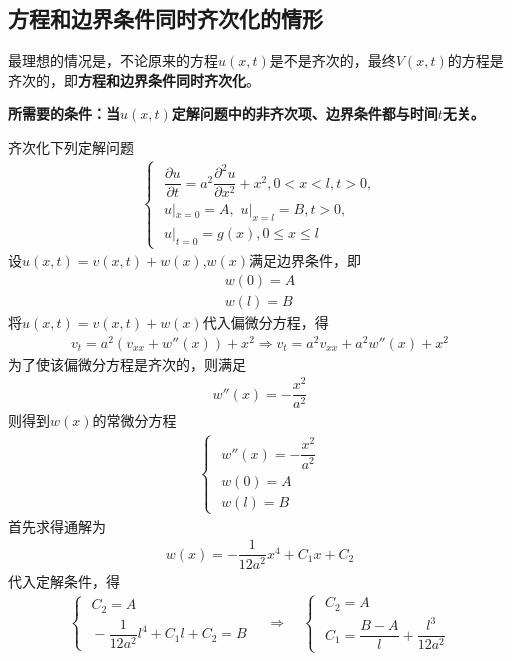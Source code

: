 \subsection{方程和边界条件同时齐次化的情形}
最理想的情况是，不论原来的方程$u(x,t)$是不是齐次的，最终$V(x,t)$的方程是齐次的，即\textbf{方程和边界条件同时齐次化}。

\textbf{所需要的条件：当$u(x,t)$定解问题中的非齐次项、边界条件都与时间$t$无关。}

\examples 齐次化下列定解问题
\begin{align*}
	\begin{cases}
		\,\, \dfrac{\partial u}{\partial t} = a^2 \dfrac{\partial^2 u}{\partial x^2} + x^2, 0<x<l, t>0,\\
		\,\, u|_{x = 0} = A, \,\, u|_{x=l} = B, t>0, \\
		\,\, u|_{t = 0} = g(x), 0 \le x \le l
	\end{cases}
\end{align*}
\solve
设$u(x,t) = v(x,t) + w(x)$,$w(x)$满足边界条件，即
\begin{align}
	w(0) = A\\
	w(l) = B
\end{align}
将$u(x,t) = v(x,t) + w(x)$代入偏微分方程，得
\begin{align*}
	v_t = a^2(v_{xx} + w''(x)) + x^2 \Rightarrow v_t = a^2v_{xx} + a^2w''(x) + x^2
\end{align*}
为了使该偏微分方程是齐次的，则满足
\begin{align}
	w''(x) = - \dfrac{x^2}{a^2}
\end{align}
则得到$w(x)$的常微分方程
\begin{align}
	\begin{cases}
		\,\, w''(x) = - \dfrac{x^2}{a^2}\\
		\,\, w(0) = A\\
		\,\, w(l) = B
	\end{cases}
\end{align}
首先求得通解为
\begin{align}
	w(x) = -\dfrac{1}{12a^2}x^4 + C_1x + C_2
\end{align}
代入定解条件，得
\begin{align*}
	\begin{cases}
		\,\, C_2 = A\\
		\,\, -\dfrac{1}{12a^2}l^4 + C_1 l +C_2 = B
	\end{cases}
	\quad 
	\Rightarrow
	\quad 
	\begin{cases}
		\,\, C_2 = A\\
		\,\,  C_1 = \dfrac{B-A}{l}+\dfrac{l^3}{12a^2}
	\end{cases}
\end{align*}
